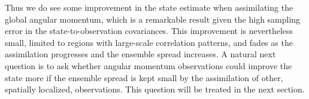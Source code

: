 Thus we do see some improvement in the state estimate when assimilating the global angular momentum, which is a remarkable result given the high sampling error in the state-to-observation covariances. 
This improvement is nevertheless small, limited to regions with large-scale correlation patterns, and fades as the assimilation progresses and the ensemble spread increases.
A natural next question is to ask whether angular momentum observations could improve the state more if the ensemble spread is kept small by the assimilation of other, spatially localized, observations. 
This question will be treated in the next section.  
